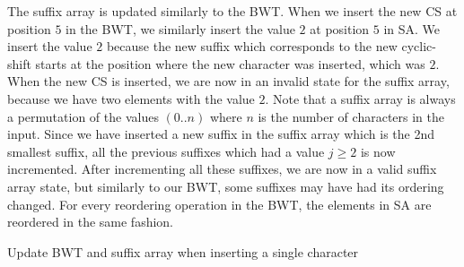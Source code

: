 The suffix array is updated similarly to the BWT. When we insert the new CS at position
$5$ in the BWT, we similarly insert the value $2$ at position $5$ in SA. We insert the
value $2$ because the new suffix which corresponds to the new cyclic-shift starts at the
position where the new character was inserted, which was $2$. When the new CS is inserted,
we are now in an invalid state for the suffix array, because we have two elements with the
value $2$. Note that a suffix array is always a permutation of the values $(0..n)$ where
$n$ is the number of characters in the input. Since we have inserted a new suffix in the
suffix array which is the 2nd smallest suffix, all the previous suffixes which had a value
$j \geq 2$ is now incremented. After incrementing all these suffixes, we are now in a
valid suffix array state, but similarly to our BWT, some suffixes may have had its
ordering changed. For every reordering operation in the BWT, the elements in SA are
reordered in the same fashion.

\begin{algorithm}[t]
  \SetAlgoLined\DontPrintSemicolon

  \vspace{0.5cm}
  \caption{Update BWT and suffix array when inserting a single character}
  \label{alg:updatesuffixarrayinsert}
\end{algorithm}

